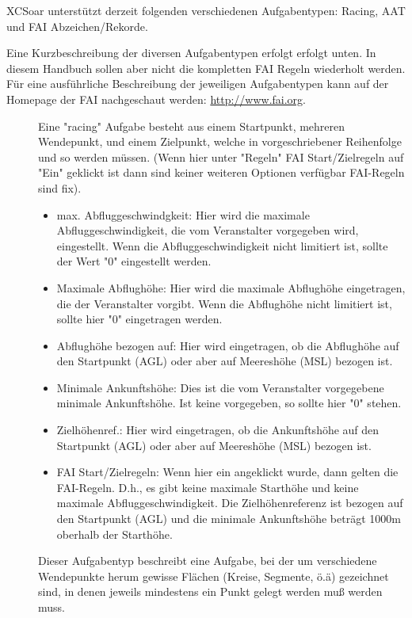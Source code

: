 \textsf{XCSoar} unterstützt derzeit folgenden verschiedenen Aufgabentypen:
Racing, AAT und FAI Abzeichen/Rekorde.

Eine Kurzbeschreibung der diversen Aufgabentypen erfolgt erfolgt unten. In diesem Handbuch sollen aber nicht die kompletten FAI Regeln wiederholt werden. Für eine ausführliche Beschreibung der jeweiligen Aufgabentypen kann  auf der Homepage der FAI nachgeschaut werden: \url{http://www.fai.org}.

\begin{description}
\item[] Eine  "racing" Aufgabe besteht aus einem Startpunkt, mehreren Wendepunkt,  und einem Zielpunkt, welche in vorgeschriebener Reihenfolge und so werden müssen. (Wenn hier unter "Regeln" FAI Start/Zielregeln auf "Ein" geklickt ist dann sind keiner weiteren Optionen verfügbar FAI-Regeln sind fix).
        \begin{itemize}
            \item max. Abfluggeschwindgkeit:     Hier wird die maximale Abfluggeschwindigkeit, die vom Veranstalter vorgegeben wird, eingestellt. Wenn die Abfluggeschwindigkeit nicht limitiert ist, sollte der Wert "0"  eingestellt werden.
            \item Maximale Abflughöhe: Hier wird die maximale Abflughöhe eingetragen, die der Veranstalter vorgibt.   Wenn die Abflughöhe nicht limitiert ist, sollte hier "0" eingetragen werden.
            \item Abflughöhe bezogen auf: Hier wird eingetragen, ob die Abflughöhe auf den Startpunkt (AGL) oder aber auf  Meereshöhe (MSL) bezogen ist.
            \item Minimale Ankunftshöhe:  Dies ist die vom Veranstalter vorgegebene minimale Ankunftshöhe. Ist keine vorgegeben, so sollte hier "0"  stehen.
            \item Zielhöhenref.:  Hier wird eingetragen, ob die Ankunftshöhe auf den  Startpunkt (AGL) oder aber auf  Meereshöhe (MSL) bezogen ist.
            \item FAI Start/Zielregeln: Wenn hier ein angeklickt wurde,  dann  gelten die FAI-Regeln. D.h., es gibt keine maximale Starthöhe und keine maximale Abfluggeschwindigkeit. Die Zielhöhenreferenz ist bezogen auf den Startpunkt (AGL) und die minimale Ankunftshöhe beträgt 1000m oberhalb der Starthöhe. 
    \end{itemize}
\item[]
 Dieser Aufgabentyp beschreibt eine  Aufgabe, bei der um verschiedene Wendepunkte herum gewisse Flächen (Kreise, Segmente, ö.ä) gezeichnet sind, in denen jeweils mindestens ein Punkt gelegt werden muß werden muss.

\end{description}
